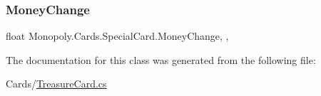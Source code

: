\subsubsection{\texorpdfstring{Money\+Change}{MoneyChange}}
{\footnotesize\ttfamily float Monopoly.\+Cards.\+Special\+Card.\+Money\+Change\hspace{0.3cm}{\ttfamily [get]}, {}, {\ttfamily [inherited]}}



The documentation for this class was generated from the following file\+:\begin{DoxyCompactItemize}
\item 
Cards/\mbox{\hyperlink{_treasure_card_8cs}{Treasure\+Card.\+cs}}\end{DoxyCompactItemize}
